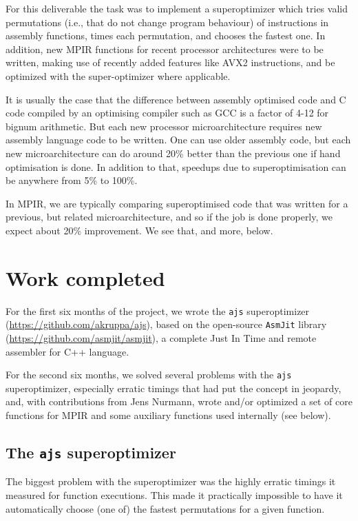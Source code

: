 For this deliverable the task was to implement a superoptimizer which
tries valid permutations (i.e., that do not change program behaviour) of
instructions in assembly functions, times each permutation, and chooses
the fastest one. In addition, new MPIR functions for recent processor
architectures were to be written, making use of recently added features
like AVX2 instructions, and be optimized with the super-optimizer where
applicable.

It is usually the case that the difference between assembly optimised
code and C code compiled by an optimising compiler such as GCC is a
factor of 4-12 for bignum arithmetic. But each new processor
microarchitecture requires new assembly language code to be written. One
can use older assembly code, but each new microarchitecture can do
around 20\% better than the previous one if hand optimisation is done.
In addition to that, speedups due to superoptimisation can be anywhere
from 5\% to 100\%.

In MPIR, we are typically comparing superoptimised code that was written
for a previous, but related microarchitecture, and so if the job is done
properly, we expect about 20\% improvement. We see that, and more,
below.

\section{Work completed}\label{work-completed}

For the first six months of the project, we wrote the \texttt{ajs}
superoptimizer (\url{https://github.com/akruppa/ajs}), based on the
open-source \texttt{AsmJit} library
(\url{https://github.com/asmjit/asmjit}), a complete Just In Time and
remote assembler for C++ language.

For the second six months, we solved several problems with the
\texttt{ajs} superoptimizer, especially erratic timings that had put the
concept in jeopardy, and, with contributions from Jens Nurmann, wrote
and/or optimized a set of core functions for MPIR and some auxiliary
functions used internally (see below).

\subsection{\texorpdfstring{The \texttt{ajs}
superoptimizer}{The ajs superoptimizer}}\label{the-ajs-superoptimizer}

The biggest problem with the superoptimizer was the highly erratic
timings it measured for function executions. This made it practically
impossible to have it automatically choose (one of) the fastest
permutations for a given function.

